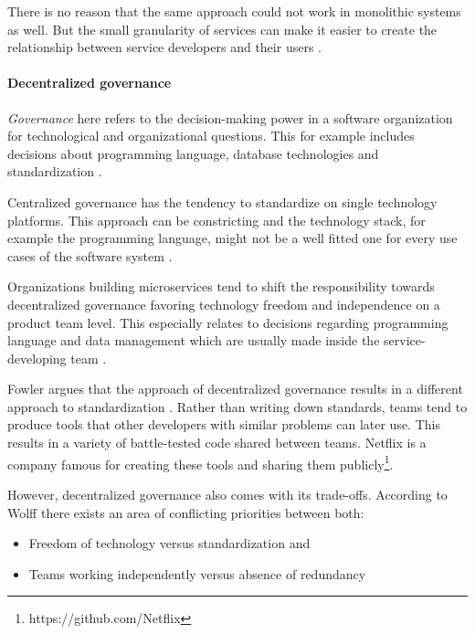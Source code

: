 There is no reason that the same approach could not work in monolithic systems as well.
But the small granularity of services can make it easier to create the relationship between service developers and their users \cite{FowlerProductProjects2014}.

\paragraph{Decentralized governance}
\label{bac:decentralizedGovernance}
\textit{Governance} here refers to the decision-making power in a software organization for technological and organizational questions.
This for example includes decisions about programming language, database technologies and standardization \cite{FowlerDecentralizedGov2014}.

Centralized governance has the tendency to standardize on single technology platforms.
This approach can be constricting and the technology stack, for example the programming language, might not be a well fitted one for every use cases of the software system \cite{FowlerDecentralizedGov2014}.

Organizations building microservices tend to shift the responsibility towards decentralized governance favoring technology freedom and independence on a product team level.
This especially relates to decisions regarding programming language and data management which are usually made inside the service-developing team  \cite{FowlerDecentralizedGov2014} \citep[p. 274]{Wolff2016}.

Fowler argues that the approach of decentralized governance results in a different approach to standardization \cite{Fowler2014}.
Rather than writing down standards, teams tend to produce tools that other developers with similar problems can later use.
This results in a variety of battle-tested code shared between teams.
Netflix is a company famous for creating these tools and sharing them publicly\footnote{https://github.com/Netflix}.

However, decentralized governance also comes with its trade-offs.
According to Wolff \citep[p. 273-275]{Wolff2016} there exists an area of conflicting priorities between both:
\begin{itemize}
\item Freedom of technology versus standardization and
\item Teams working independently versus absence of redundancy
\end{itemize}

